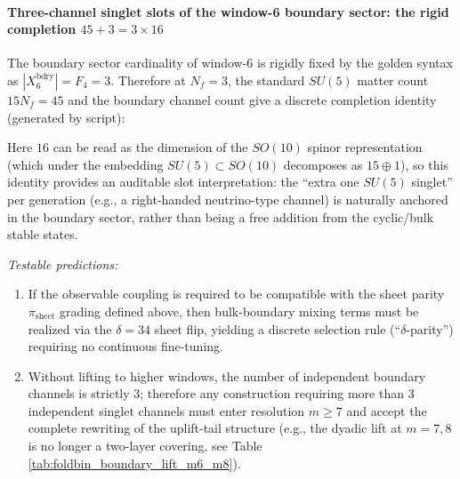 \paragraph{Three-channel singlet slots of the window-6 boundary sector: the rigid completion \(45+3=3\times 16\)}
The boundary sector cardinality of window-6 is rigidly fixed by the golden syntax as \(|X_6^{\mathrm{bdry}}|=F_4=3\).
Therefore at \(N_f=3\), the standard \(SU(5)\) matter count \(15N_f=45\) and the boundary channel count give a discrete completion identity (generated by script):

Here \(16\) can be read as the dimension of the \(SO(10)\) spinor representation (which under the embedding \(SU(5)\subset SO(10)\) decomposes as \(15\oplus 1\)),
so this identity provides an auditable slot interpretation: the ``extra one \(SU(5)\) singlet'' per generation (e.g., a right-handed neutrino-type channel) is naturally anchored in the boundary sector, rather than being a free addition from the cyclic/bulk stable states.
\par
\emph{Testable predictions:}
\begin{enumerate}
  \item If the observable coupling is required to be compatible with the sheet parity \(\pi_{\mathrm{sheet}}\) grading defined above, then bulk-boundary mixing terms must be realized via the \(\delta=34\) sheet flip, yielding a discrete selection rule (``\(\delta\)-parity'') requiring no continuous fine-tuning.
  \item Without lifting to higher windows, the number of independent boundary channels is strictly \(3\); therefore any construction requiring more than \(3\) independent singlet channels must enter resolution \(m\ge 7\) and accept the complete rewriting of the uplift-tail structure (e.g., the dyadic lift at \(m=7,8\) is no longer a two-layer covering, see Table \ref{tab:foldbin_boundary_lift_m6_m8}).
\end{enumerate}

